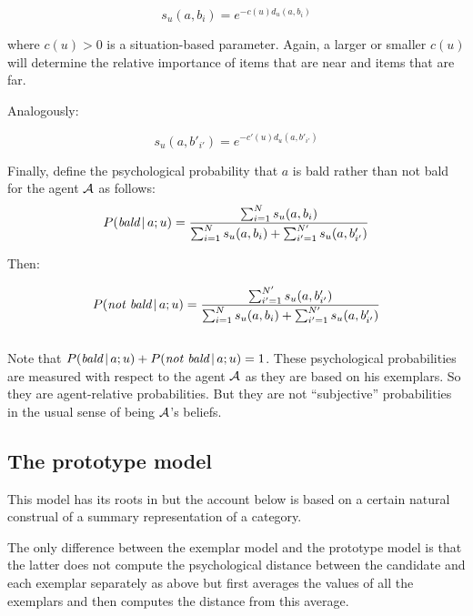 \[ s_u(a, b_i) = e^{-c(u)d_u(a, b_i)} \] 

\noindent where $c(u) > 0$ is a situation-based parameter. Again, a larger or smaller $c(u)$ will determine the relative importance of items that are near and items that are far.

Analogously:

\[ s_u(a, b'_{i'}) = e^{-c'(u)d_u(a, b'_{i'})} \]


Finally, define the psychological probability that $a$ is bald rather than not bald for the agent $\cal A$ as follows:
~\\
\[ P(\emph{bald} \,|\, a; u) = \frac{\sum_{i = 1}^N s_u(a, b_i)}{\sum_{i = 1}^N s_u(a, b_i) + \sum_{i' = 1}^{N'} s_u(a, b'_{i'})} \]

\noindent Then:

\[ P(\emph{not bald} \,|\, a; u) = \frac{\sum_{i' = 1}^{N'} s_u(a, b'_{i'})}{\sum_{i = 1}^N s_u(a, b_i) + \sum_{i' = 1}^{N'} s_u(a, b'_{i'})} \]
~\\
Note that $P(\emph{bald} \,|\, a; u) + P(\emph{not bald} \,|\, a; u) = 1$. These psychological probabilities are measured with respect to the agent $\cal A$ as they are based on his exemplars. So they are agent-relative probabilities. But they are not ``subjective'' probabilities in the usual sense of being $\cal A$'s beliefs. 


%

\subsection{The prototype model}

This model has its roots in \citet{rm:fr} but the account below is based on a certain natural construal of a summary representation of a category.

The only difference between the exemplar model and the prototype model is that the latter does not compute the psychological distance between the candidate and each exemplar separately as above but first averages the values of all the exemplars and then computes the distance from this average.

